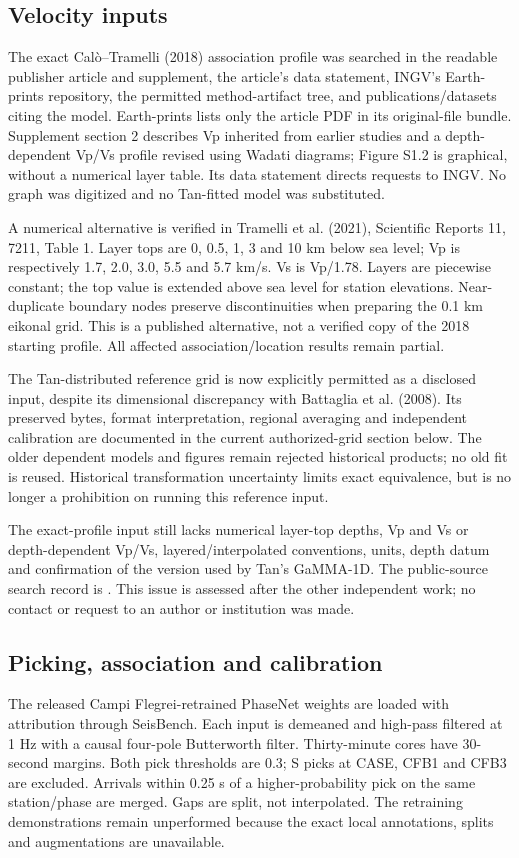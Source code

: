 \subsection*{Velocity inputs}
The exact Cal\`o--Tramelli (2018) association profile was searched in the readable publisher article and supplement, the article's data statement, INGV's Earth-prints repository, the permitted method-artifact tree, and publications/datasets citing the model. Earth-prints lists only the article PDF in its original-file bundle. Supplement section 2 describes Vp inherited from earlier studies and a depth-dependent Vp/Vs profile revised using Wadati diagrams; Figure S1.2 is graphical, without a numerical layer table. Its data statement directs requests to INGV. No graph was digitized and no Tan-fitted model was substituted.

A numerical alternative is verified in Tramelli et al. (2021), Scientific Reports 11, 7211, Table 1. Layer tops are 0, 0.5, 1, 3 and 10 km below sea level; Vp is respectively 1.7, 2.0, 3.0, 5.5 and 5.7 km/s. Vs is Vp/1.78. Layers are piecewise constant; the top value is extended above sea level for station elevations. Near-duplicate boundary nodes preserve discontinuities when preparing the 0.1 km eikonal grid. This is a published alternative, not a verified copy of the 2018 starting profile. All affected association/location results remain partial.

The Tan-distributed reference grid is now explicitly permitted as a disclosed input, despite its dimensional discrepancy with Battaglia et al. (2008). Its preserved bytes, format interpretation, regional averaging and independent calibration are documented in the current authorized-grid section below. The older dependent models and figures remain rejected historical products; no old fit is reused. Historical transformation uncertainty limits exact equivalence, but is no longer a prohibition on running this reference input.

The exact-profile input still lacks numerical layer-top depths, Vp and Vs or depth-dependent Vp/Vs, layered/interpolated conventions, units, depth datum and confirmation of the version used by Tan's GaMMA-1D. The public-source search record is . This issue is assessed after the other independent work; no contact or request to an author or institution was made.

\subsection*{Picking, association and calibration}
The released Campi Flegrei-retrained PhaseNet weights are loaded with attribution through SeisBench. Each input is demeaned and high-pass filtered at 1 Hz with a causal four-pole Butterworth filter. Thirty-minute cores have 30-second margins. Both pick thresholds are 0.3; S picks at CASE, CFB1 and CFB3 are excluded. Arrivals within 0.25 s of a higher-probability pick on the same station/phase are merged. Gaps are split, not interpolated. The retraining demonstrations remain unperformed because the exact local annotations, splits and augmentations are unavailable.

